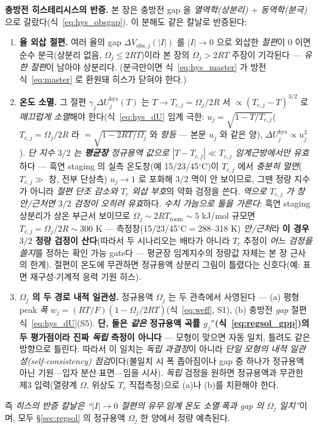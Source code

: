 \documentclass[11pt,a4paper]{article}
\newcommand{\hys}{\mathrm{hys}}
\begin{document}
\textbf{충방전 히스테리시스의 반증.} 본 장은 충방전 gap 을 \emph{열역학(상분리) $+$ 동역학(분극)}으로
갈랐다(식~\eqref{eq:hys_obsgap}). 이 분해도 같은 칼날로 반증된다:
\begin{enumerate}[label=(\roman*),leftmargin=2.0em,itemsep=2pt]
\item \textbf{율 외삽 절편.} 여러 율의 gap $\Delta V_{\mathrm{obs},j}(|I|)$ 를 $|I|\to0$ 으로 외삽한 \emph{절편}이 $0$ 이면
  순수 분극(상분리 없음, $\Omega_j\le2RT$)이라 본 장의 $\Omega_j>2RT$ 주장이 기각된다 — \emph{유한 절편}이 남아야
  상분리다. (분극만이면 식~\eqref{eq:hys_master} 가 방전식~\eqref{eq:master} 로 환원돼 히스가 닫혀야 한다.)
\item \textbf{온도 소멸.} 그 절편 $\gamma_j\Delta U_j^\hys(T)$ 는 $T\to T_{c,j}=\Omega_j/2R$ 서
  $\propto(T_{c,j}-T)^{3/2}$ 로 \emph{매끄럽게 소멸}해야 한다(식~\eqref{eq:hys_dU} 임계 극한:
  $u_j=\sqrt{1-T/T_{c,j}}$($T_{c,j}=\Omega_j/2R$ 라 $=\sqrt{1-2RT/\Omega_j}$ 와 \emph{항등} — 본문 $u_j$ 와 같은 양),
  $\Delta U_j^\hys\!\propto\!u_j^3$). \emph{단 지수 $3/2$ 는 \textbf{평균장} 정규용액 값으로
  $|T-T_{c,j}|\ll T_{c,j}$ 임계근방에서만 유효}하다 — 흑연 staging 의 실측 온도창(예 15/23/45$^\circ$C)이 $T_{c,j}$ 에서
  \emph{충분히 멀면}($T_{c,j}\gg$ 창, 전부 단상측) $u_j\to1$ 로 포화해 $3/2$ 멱이 안 보이므로, 그땐 정량 지수가 아니라
  \emph{절편 단조 감소와 $T_c$ 외삽 부호}의 약화 검정을 쓴다. \emph{역으로 $T_{c,j}$ 가 창 \emph{안/근처}면 $3/2$ 검정이
  오히려 유효}하다. \emph{수치 가늠으로 둘을 가른다}: 흑연 staging 상분리가 상온 부근서 보이므로 $\Omega_j\sim2RT_{\mathrm{room}}
  \!\sim5$ kJ/mol 규모면 $T_{c,j}=\Omega_j/2R\sim300$ K — 측정창(15/23/45$^\circ$C$=$288–318 K) \emph{안/근처}라 \textbf{이
  경우 $3/2$ 정량 검정이 산다}(따라서 두 시나리오는 배타가 아니라 $T_c$ 추정이 \emph{어느 검정을 쓸지}를 정하는 확인
  가능 gate다 — 평균장 임계지수의 정량값 자체는 본 장 근사의 한계). 절편이 온도에 무관하면 정규용액 상분리 그림이 틀렸다는 신호다(예:
  표면 재구성$\cdot$기계적 응력 기원 히스).
\item \textbf{$\Omega_j$ 의 두 경로 내적 일관성.} 정규용액 $\Omega_j$ 는 두 관측에서 사영된다 — (a) 평형 peak
  \emph{폭} $w_j=(RT/F)(1-\Omega_j/2RT)$(식~\eqref{eq:weff}, S1), (b) 충방전 \emph{gap} 절편 식~\eqref{eq:hys_dU}(S5).
  \textbf{단, 둘은 \emph{같은} 정규용액 곡률 $g_j''$(식~\eqref{eq:regsol_gpp})의 두 평가점이라 진짜 \emph{독립} 측정이
  아니다} — 모형이 맞으면 자동 일치, 틀려도 같은 방향으로 틀린다. 따라서 이 일치는 \emph{독립 과결정}이 아니라
  \emph{단일 모형의 내적 일관성(self-consistency) 점검}이다(불일치 시 폭 좁아짐이나 gap 중 하나가 정규용액 아닌
  기원—입자 분산$\cdot$표면—임을 시사). \emph{독립} 검정을 원하면 정규용액과 무관한 제3 입력(열량계 $\Omega$,
  위상도 $T_c$ 직접측정)으로 (a)나 (b)를 치환해야 한다.
\end{enumerate}
즉 \emph{히스의 반증 칼날은 ``$|I|\to0$ 절편의 유무$\cdot$임계 온도 소멸$\cdot$폭과 gap 의 $\Omega_j$ 일치''}이며,
모두 \S\ref{sec:regsol} 의 정규용액 $\Omega_j$ 한 양에서 정량 예측된다.
\end{document}
